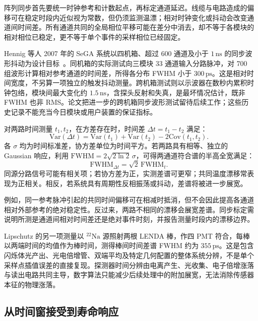 阵列同步首先要统一时钟参考和计数起点，再标定通道延迟。线缆与电路造成的偏移可在稳定时段内近似视为常数，但仍须监测温漂；相对时钟变化或抖动会改变通道间时间差。所有通道共同的全局相位平移可能在差分中消去，却不等于各模块的相对相位已稳定，更不等于单个事件的采样相位已经固定。

Hennig 等人 2007 年的 SeGA 系统以四机箱、超过 600 通道及小于 $1\,\mathrm{ns}$ 的同步波形抖动为设计目标~\cite{doctoral-r1-g32-hennig-2007-pixie16-multi-chassis-sync}。同机箱的实际测试向三模块 33 通道输入分路脉冲，对 700 组波形计算相对参考通道的时间差，所得各分布 FWHM 小于 $300\,\mathrm{ps}$。这是相对时间宽度，不另算一项独立的触发抖动测量。跨机箱测试则以示波器在数秒内累积时钟包络，模块间最大变化约 $1.5\,\mathrm{ns}$，含探头反射和失真，是最坏情况估计，既非 FWHM 也非 RMS。论文把进一步的跨机箱同步波形测试留待后续工作；这些历史记录不能充当今日模块或用户装置的保证指标。

对两路时间测量 $t_1, t_2$，在方差存在时，时间差 $\Delta t = t_1 - t_2$ 满足：
\begin{equation}\label{eq:5-4-var-dt}
\mathrm{Var}(\Delta t) = \mathrm{Var}(t_1) + \mathrm{Var}(t_2) - 2\mathrm{Cov}(t_1, t_2).
\end{equation}
各 $\sigma$ 均为时间标准差，协方差单位为时间平方。若两路具有相等、独立的 Gaussian 响应，利用 $\mathrm{FWHM} = 2\sqrt{2\ln 2}\,\sigma$，可得两通道符合谱的半高全宽满足：
\begin{equation}\label{eq:5-4-fwhm-gauss}
\mathrm{FWHM}_{\Delta t} = \sqrt{2}\,\mathrm{FWHM}_t.
\end{equation}
同源分路信号可能有相关项；若协方差为正，实测差谱可更窄；共同温度漂移常表现为正相关。相反，若系统具有周期性反相振荡或抖动，差谱将被进一步展宽。

例如，同一参考脉冲引起的共同时间偏移可在相减时抵消，但不会因此提高各通道相对外部参考的绝对稳定性。反过来，两路不相同的漂移会展宽差谱。同步标定需说明所测是通道间相对时间差还是绝对事件时刻，并报告测量时段内的漂移边界。

Lipschutz 的另一项测量以 $^{22}\mathrm{Na}$ 源照射两根 LENDA 棒，作四 PMT 符合，每棒以两端时间的均值作为棒时间，测得棒间时间差谱 FWHM 约为 $355\,\mathrm{ps}$。这是包含闪烁体光产出、光电倍增管、双端平均及特定几何配置的整体系统分辨，不是单个采样点插值误差的直接复现。探测器时间分辨由电离产生、光收集、电子倍增涨落与读出电路共同主导，数字算法只能减少后续处理中的附加展宽，无法消除传感器本征的物理涨落。

\subsection{从时间窗接受到寿命响应}\label{subsec:5-4-4}

